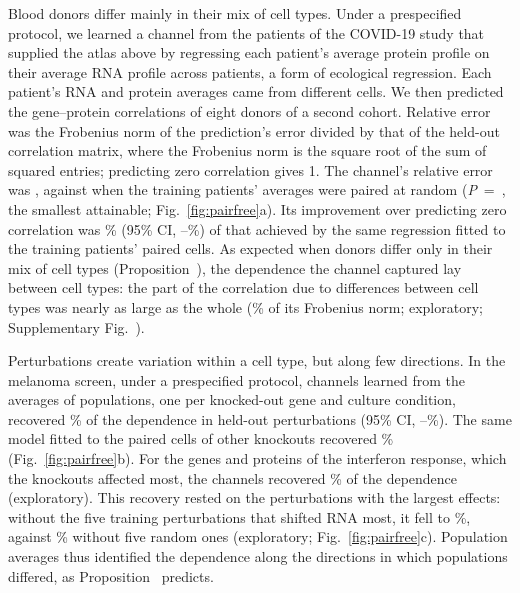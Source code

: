 \documentclass[pdflatex,sn-vancouver-num,iicol]{sn-jnl}
\begin{document}
Blood donors differ mainly in their mix of cell types. Under a prespecified protocol, we learned a channel from the \XsPatients{} patients of the COVID-19 study that supplied the atlas above\cite{stephenson2021} by regressing each patient's average protein profile on their average RNA profile across patients, a form of ecological regression\cite{goodman1953,hoerl1970}. Each patient's RNA and protein averages came from different cells. We then predicted the gene--protein correlations of eight donors of a second cohort\cite{hao2021}. Relative error was the Frobenius norm of the prediction's error divided by that of the held-out correlation matrix, where the Frobenius norm is the square root of the sum of squared entries; predicting zero correlation gives 1. The channel's relative error was \XsHaoErrPfMeans, against \XsHaoNullErr{} when the training patients' averages were paired at random (\textit{P}~=~\XsHaoPermP, the smallest attainable\cite{phipson2010}; Fig.~\ref{fig:pairfree}a). Its improvement over predicting zero correlation was \XsHaoShare\% (95\% CI, \XsHaoShareLo--\XsHaoShareHi\%) of that achieved by the same regression fitted to the training patients' paired cells. As expected when donors differ only in their mix of cell types (Proposition~), the dependence the channel captured lay between cell types: the part of the correlation due to differences between cell types was nearly as large as the whole (\XsMixHaoBetweenShare\% of its Frobenius norm; exploratory; Supplementary Fig.~).

Perturbations create variation within a cell type, but along few directions. In the melanoma screen, under a prespecified protocol, channels learned from the averages of \PtTrainPops{} populations, one per knocked-out gene and culture condition, recovered \PtRfPrimary\% of the dependence in held-out perturbations (95\% CI, \PtRfPrimaryLo--\PtRfPrimaryHi\%). The same model fitted to the paired cells of other knockouts recovered \PtRfPaired\% (Fig.~\ref{fig:pairfree}b). For the genes and proteins of the interferon response, which the knockouts affected most, the channels recovered \PgIfnPf\% of the dependence (exploratory). This recovery rested on the perturbations with the largest effects: without the five training perturbations that shifted RNA most, it fell to \DsFiveIfnStr\%, against \DsFiveIfnRand\% without five random ones (exploratory; Fig.~\ref{fig:pairfree}c). Population averages thus identified the dependence along the directions in which populations differed, as Proposition~ predicts.
\end{document}
